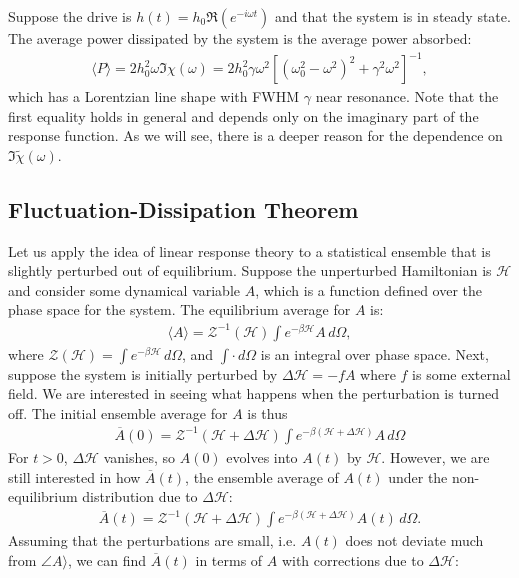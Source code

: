 \documentclass[reprint,
nofootinbib,
amsmath,amssymb,
aps]{revtex4-1}
\newcommand{\be}{\beta}
\begin{document}
Suppose the drive is $h(t) = h_0 \Re(e^{-i\omega t})$ and that the system is in steady state. The average power dissipated by the system is the average power absorbed: 
\begin{align*}
\langle P \rangle = 2h_0^2 \omega \Im\chi(\omega) = 2h_0^2  \gamma \omega^2 [(\omega_0^2 - \omega^2)^2 + \gamma^2 \omega^2]^{-1},
\end{align*}
which has a Lorentzian line shape with FWHM $\gamma$ near resonance. Note that the first equality holds in general and depends only on the imaginary part of the response function. As we will see, there is a deeper reason for the dependence on $\Im \tilde{\chi}(\omega)$.

\subsection{Fluctuation-Dissipation Theorem}
Let us apply the idea of linear response theory to a statistical ensemble that is slightly perturbed out of equilibrium. Suppose the unperturbed Hamiltonian is $\mathcal{H}$ and consider some dynamical variable $A$, which is a function defined over the phase space for the system. The equilibrium average for $A$ is:
\begin{align*}
\langle A \rangle =  \mathcal{Z}^{-1}(\mathcal{H}) \int e^{-\be \mathcal{H}} A\, d\Omega,
\end{align*}
where $\mathcal{Z}(\mathcal{H}) = \int e^{-\be \mathcal{H}} \, d\Omega$, and $\int \cdot \,d\Omega$ is an integral over phase space. Next, suppose the system is initially perturbed by $\Delta \mathcal{H} = -f A$ where $f$ is some external field. We are interested in seeing what happens when the perturbation is turned off. The initial ensemble average for $A$ is thus 
\begin{align*}
\overline{A}(0) = \mathcal{Z}^{-1}(\mathcal{H} + \Delta \mathcal{H})  \int e^{-\be (\mathcal{H} + \Delta \mathcal{H})} A \, d\Omega 
\end{align*}
For $t>0$, $\Delta \mathcal{H}$ vanishes, so $A(0)$ evolves into $A(t)$ by $\mathcal{H}$. However, we are still interested in how $\overline{A}(t)$, the ensemble average of $A(t)$ under the non-equilibrium distribution due to $\Delta \mathcal{H}$:
\begin{align*}
\overline{A}(t) = \mathcal{Z}^{-1}(\mathcal{H} + \Delta \mathcal{H})  \int e^{-\be(\mathcal{H} + \Delta \mathcal{H})} A(t) \, d\Omega. 
\end{align*}
Assuming that the perturbations are small, i.e. $A(t)$ does not deviate much from $\angle A \rangle$, we can find $\overline{A}(t)$ in terms of $A$ with corrections due to $\Delta \mathcal{H}$:
\end{document}
